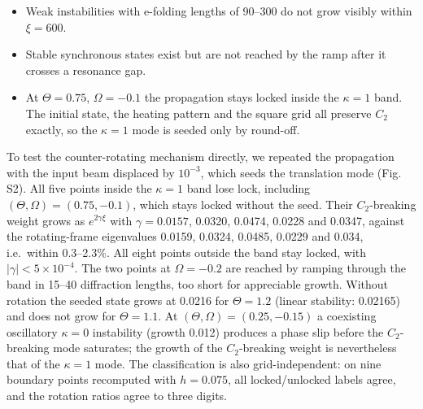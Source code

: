 \begin{itemize}
\tightlist
\item
  Weak instabilities with e-folding lengths of 90--300 do not grow visibly within \(\xi = 600\).
\item
  Stable synchronous states exist but are not reached by the ramp after it crosses a resonance gap.
\item
  At \(\Theta = 0.75\), \(\Omega = -0.1\) the propagation stays locked inside the \(\kappa = 1\) band. The initial state, the heating pattern and the square grid all preserve \(C_2\) exactly, so the \(\kappa = 1\) mode is seeded only by round-off.
\end{itemize}

To test the counter-rotating mechanism directly, we repeated the propagation with the input beam displaced by \(10^{-3}\), which seeds the translation mode (Fig. S2). All five points inside the \(\kappa = 1\) band lose lock, including \((\Theta, \Omega) = (0.75, -0.1)\), which stays locked without the seed. Their \(C_2\)-breaking weight grows as \(e^{2\gamma\xi}\) with \(\gamma = 0.0157\), 0.0320, 0.0474, 0.0228 and 0.0347, against the rotating-frame eigenvalues 0.0159, 0.0324, 0.0485, 0.0229 and 0.034, i.e.~within 0.3--2.3\%. All eight points outside the band stay locked, with \(|\gamma| < 5\times10^{-4}\). The two points at \(\Omega = -0.2\) are reached by ramping through the band in 15--40 diffraction lengths, too short for appreciable growth. Without rotation the seeded state grows at 0.0216 for \(\Theta = 1.2\) (linear stability: 0.02165) and does not grow for \(\Theta = 1.1\). At \((\Theta, \Omega) = (0.25, -0.15)\) a coexisting oscillatory \(\kappa = 0\) instability (growth 0.012) produces a phase slip before the \(C_2\)-breaking mode saturates; the growth of the \(C_2\)-breaking weight is nevertheless that of the \(\kappa = 1\) mode. The classification is also grid-independent: on nine boundary points recomputed with \(h = 0.075\), all locked/unlocked labels agree, and the rotation ratios agree to three digits.

